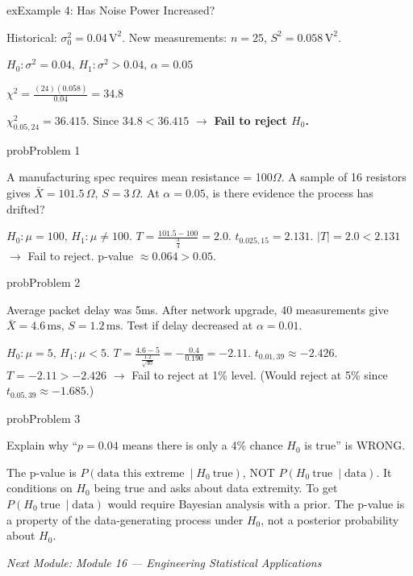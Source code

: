 \begin{PSbox}[unbreakable]{ex}{Example 4: Has Noise Power Increased?}

Historical: $\sigma_{0}^{2} = 0.04\,\mathrm{V}^{2}$. New measurements: $n = 25,\, S^{2} = 0.058\,\mathrm{V}^{2}$.

$H_{0}: \sigma^{2} = 0.04,\, H_{1}: \sigma^{2} > 0.04,\, \alpha = 0.05$

$\displaystyle \chi^{2} = \frac{(24)(0.058)}{0.04} = 34.8$

$\chi^{2}_{0.05, 24} = 36.415$. Since $34.8 < 36.415$ \ensuremath{\to} \textbf{Fail to reject $H_{0}$.}

\end{PSbox}


\begin{PSbox}[unbreakable]{prob}{Problem 1}

A manufacturing spec requires mean resistance = 100\ensuremath{\Omega}. A sample of 16 resistors gives $\bar{X} = 101.5\,\Omega,\, S = 3\,\Omega$. At $\alpha = 0.05$, is there evidence the process has drifted?

\PSsolution{} $H_{0}: \mu = 100,\, H_{1}: \mu \ne 100$. $T = \frac{101.5-100}{\frac{3}{4}} = 2.0$. $t_{0.025,15} = 2.131$. $\lvert T\rvert = 2.0 < 2.131$ \ensuremath{\to} Fail to reject. p-value $\approx 0.064 > 0.05$.

\end{PSbox}

\begin{PSbox}[unbreakable]{prob}{Problem 2}

Average packet delay was 5ms. After network upgrade, 40 measurements give $\bar{X} = 4.6\,\mathrm{ms},\, S = 1.2\,\mathrm{ms}$. Test if delay decreased at $\alpha = 0.01$.

\PSsolution{} $H_{0}: \mu = 5,\, H_{1}: \mu < 5$. $T = \frac{4.6-5}{\frac{1.2}{\sqrt{40}}} = -\frac{0.4}{0.190} = -2.11$. $t_{0.01,39} \approx -2.426$. $T = -2.11 > -2.426$ \ensuremath{\to} Fail to reject at 1\% level. (Would reject at 5\% since $t_{0.05,39} \approx -1.685.$)

\end{PSbox}

\begin{PSbox}[unbreakable]{prob}{Problem 3}

Explain why ``$p = 0.04$ means there is only a 4\% chance $H_{0}$ is true'' is WRONG.

\PSsolution{} The p-value is $P(\text{data this extreme}\ \mid H_{0}\ \text{true})$, NOT $P(H_{0}\ \text{true}\ \mid \text{data})$. It conditions on $H_{0}$ being true and asks about data extremity. To get $P(H_{0}\ \text{true}\ \mid \text{data})$ would require Bayesian analysis with a prior. The p-value is a property of the data-generating process under $H_{0}$, not a posterior probability about $H_{0}$.

\emph{Next Module: {Module 16 — Engineering Statistical Applications}}

\end{PSbox}
